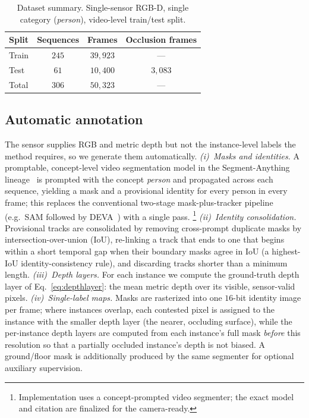 \documentclass[sigconf, review=true]{acmart}
\begin{document}
\begin{table}[t]
\centering
\caption{Dataset summary. Single-sensor RGB-D, single category
(\emph{person}), video-level train/test split.}
\label{tab:dataset}
\begin{tabular}{lccc}
\toprule
Split & Sequences & Frames & Occlusion frames \\
\midrule
Train & $245$ & $39{,}923$ & --- \\
Test  & $61$  & $10{,}400$ & $3{,}083$ \\
\midrule
Total & $306$ & $50{,}323$ & --- \\
\bottomrule
\end{tabular}
\end{table}

\subsection{Automatic annotation}
The sensor supplies RGB and metric depth but not the instance-level labels the
method requires, so we generate them automatically.
\emph{(i)~Masks and identities.} A promptable, concept-level video segmentation
model in the Segment-Anything lineage~\cite{kirillov2023sam,ravi2024sam2} is
prompted with the concept \emph{person} and propagated across each sequence,
yielding a mask and a provisional identity for every person in every frame;
this replaces the conventional two-stage mask-plus-tracker pipeline
(e.g.\ SAM followed by DEVA~\cite{cheng2023deva}) with a single pass.%
\footnote{Implementation uses a concept-prompted video segmenter; the exact
model and citation are finalized for the camera-ready.}
\emph{(ii)~Identity consolidation.} Provisional tracks are consolidated by
removing cross-prompt duplicate masks by intersection-over-union (IoU),
re-linking a track that ends to one that begins within a short temporal gap
when their boundary masks agree in IoU (a highest-IoU identity-consistency
rule), and discarding tracks shorter than a minimum length.
\emph{(iii)~Depth layers.} For each instance we compute the ground-truth depth
layer of Eq.~\eqref{eq:depthlayer}: the mean metric depth over its visible,
sensor-valid pixels.
\emph{(iv)~Single-label maps.} Masks are rasterized into one $16$-bit identity
image per frame; where instances overlap, each contested pixel is assigned to
the instance with the smaller depth layer (the nearer, occluding surface),
while the per-instance depth layers are computed from each instance's full mask
\emph{before} this resolution so that a partially occluded instance's depth is
not biased. A ground/floor mask is additionally produced by the same segmenter
for optional auxiliary supervision.
\end{document}
